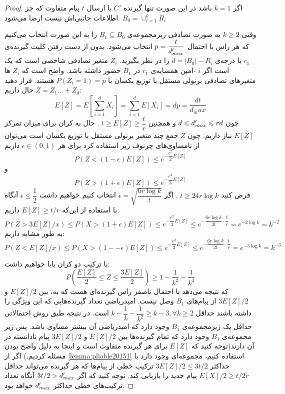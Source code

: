 \begin{proof}
	اگر
	$k = 1$
	باشد در این صورت تنها گیرنده
	$C'$
	با ارسال
	$t$
	پیام متفاوت که جز اطلاعات جانبی‌اش نیست ارضا می‌شود.
	$B_0 = \cup_{i = 1}^{k} R_i$
	
	وقتی
	$k \geq 2$
	به صورت تصادفی زیرمجموعه‌ی
	$B_1 \subseteq B_0$
	را به این صورت انتخاب می‌کنیم که هر راس با احتمال
	$p = \dfrac{t}{d_{max}'}$
	انتخاب می‌شود. بدون از دست رفتن کلیت گیرنده‌ی
	$c_1$
	با درجه‌ی
	$d = |B_0| - R_i$
	را در نظر بگیرید.
	$Z_i$
	متغیر تصادفی شاخصی است که یک است اگر
	$i$
	-امین همسایه‌ی
	$c_1$
	در
	$B_1$
	حضور داشته باشد. واضح است که
	$Z_i$
	ها متغیرهای تصادفی برنولی مستقل با توزیع یکسان با
	$P(Z_i = 1) = p$
	هستند. قرار دهید
	$Z = Z_1 \ldots + Z_d$
	حال داریم:
	\begin{equation}
		E[Z] = E[\sum\limits_{i = 1}^{d} X_i ] = \sum\limits_{i = 1}^{d} E[X_i] = dp = \dfrac{dt}{d_max}
	\end{equation}
	چون
	$d \leqslant d_{max}' \leqslant rd$
	و همچنین
	$t \geq E[Z] \geq \dfrac{t}{r}$
	. حال به کران برای میزان تمرکز
	$E[Z]$
	نیاز داریم. چون
	$Z$
	جمع چند متغیر برنولی مستقل با توزیع یکسان است می‌توان از نامساوی‌های چرنوف زیر استفاده کرد
	\cite{Dubhashi_Panconesi_2009}
	برای هر
	$\epsilon \in (0, 1)$
	داریم
	$$P(Z < (1 - \epsilon) E[Z]) \leq e^{- \dfrac{\epsilon^2}{2} E[Z]}$$
	و
	$$P(Z > (1 + \epsilon) E[Z]) \leq e^{- \dfrac{\epsilon^2}{3} E[Z]}$$
	فرض کنید
	$t \geq 24 r \log k$
	. اگر
	$\epsilon = \sqrt{\dfrac{6r \log k}{t}}$
	انتخاب کنیم خواهیم داشت
	$\epsilon \leq \dfrac{1}{2}$
	آنگاه با استفاده از این‌که
	$E[Z] \geq t/r$
	داریم:
	\begin{equation}
		P(Z > 3 E[Z]/x) \leq P(X > (1 + \epsilon) E[Z]) \leq e^{-\dfrac{\epsilon^2}{3} E[Z]} \leq e^{- \dfrac{6 r \log k}{3 t} \cdot \dfrac{t}{r}} = e^{- 2 \log k} = k^{-2}
	\end{equation}
	به طور مشابه داریم:
	\begin{equation}
		P(Z < E[Z]/x) \leq P(X > (1 -- \epsilon) E[Z]) \leq e^{-\dfrac{\epsilon^2}{2} E[Z]} \leq e^{- \dfrac{6 r \log k}{2 t} \cdot \dfrac{t}{r}} = e^{-3 \log k} = k^{-3}
	\end{equation}
	
	با ترکیب دو کران بابا خواهیم داشت:
	\begin{equation}
		P(\dfrac{E[Z]}{2} \leq Z \leq \dfrac{3E[Z]}{2}) \geq 1 - \dfrac{1}{k^2} - \dfrac{1}{k^3}
	\end{equation}
	که نتیجه می‌دهد با احتمال ناصفر راس گیرنده‌ای هست که به، بین
	$E[Z]/2$
	و
	$3E[Z]/2$
	از پیام‌های
	$B_1$
	وصل نیست. امیدریاضی تعداد گیرنده‌هایی که این ویژگی را داشته باشند حداقل
	$k - \dfrac{1}{k} - \dfrac{1}{k^2} \geq k - 3, \forall k \geq 2$
	است. در نتیجه طبق روش احتمالاتی حداقل یک زیرمجموعه‌ی
	$B_1$
	وجود دارد که امیدریاضی آن بیشتر مساوی باشد. پس زیر مجموعه‌ی
	$B_1$
	وجود دارد که تمام گیرنده‌ها بین
	$E[Z] / 2$
	و
	$3E[Z]/2$
	پیام نادانسته در آن دارند(توجه کنید که
	$E[Z]$
	برای هر گیرنده متفاوت است و اینجا به دلیل واضح بودن مسئله 
	کردیم.) اگر از 
	\autoref{lemma:pliable20151}
	استفاده کنیم، مجموعه‌ای وجود دارد با حداکثر
	$3E[Z]/2 \leq 3t/2$
	ترکیب خطی از پیام‌ها که هر گیرنده می‌تواند حداقل
	$E[X]/2 \geq t/2r$
	پیام جدید را بازیابی کند. توجه کنید که اگر
	$3t/2 > d_{max}'$
	آنگاه تعداد ترکیب‌های خطی حداکثر
	$d_{max}'$
	خواهد بود.
	

\end{proof}
